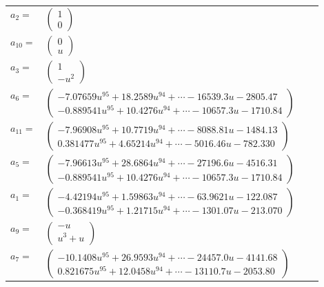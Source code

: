 \documentclass[1p]{elsarticle_modified}
\theoremstyle{definition}
\begin{document}
\begin{tabular}{m{7pt} m{180pt} m{7pt} m{180pt} }
\flushright $a_{2}=$&$\begin{pmatrix}1\\0\end{pmatrix}$ \\
\flushright $a_{10}=$&$\begin{pmatrix}0\\u\end{pmatrix}$ \\
\flushright $a_{3}=$&$\begin{pmatrix}1\\- u^2\end{pmatrix}$ \\
\flushright $a_{6}=$&$\begin{pmatrix}-7.07659 u^{95}+18.2589 u^{94}+\cdots-16539.3 u-2805.47\\-0.889541 u^{95}+10.4276 u^{94}+\cdots-10657.3 u-1710.84\end{pmatrix}$ \\
\flushright $a_{11}=$&$\begin{pmatrix}-7.96908 u^{95}+10.7719 u^{94}+\cdots-8088.81 u-1484.13\\0.381477 u^{95}+4.65214 u^{94}+\cdots-5016.46 u-782.330\end{pmatrix}$ \\
\flushright $a_{5}=$&$\begin{pmatrix}-7.96613 u^{95}+28.6864 u^{94}+\cdots-27196.6 u-4516.31\\-0.889541 u^{95}+10.4276 u^{94}+\cdots-10657.3 u-1710.84\end{pmatrix}$ \\
\flushright $a_{1}=$&$\begin{pmatrix}-4.42194 u^{95}+1.59863 u^{94}+\cdots-63.9621 u-122.087\\-0.368419 u^{95}+1.21715 u^{94}+\cdots-1301.07 u-213.070\end{pmatrix}$ \\
\flushright $a_{9}=$&$\begin{pmatrix}- u\\u^3+u\end{pmatrix}$ \\
\flushright $a_{7}=$&$\begin{pmatrix}-10.1408 u^{95}+26.9593 u^{94}+\cdots-24457.0 u-4141.68\\0.821675 u^{95}+12.0458 u^{94}+\cdots-13110.7 u-2053.80\end{pmatrix}$ \\

\end{tabular}
\end{document}

